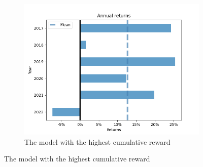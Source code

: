 \documentclass[../xlapes02]{subfiles}
\begin{document}
\begin{figure}[h!]
\begin{subfigure}[t]{\experimentimgwidth\textwidth}
            \includegraphics[width=\linewidth]{image/figure/annual_returns_max}
            \caption{The model with the highest cumulative reward}
        \end{subfigure}
        \vspace{0.5cm}


\end{figure}
\end{document}
